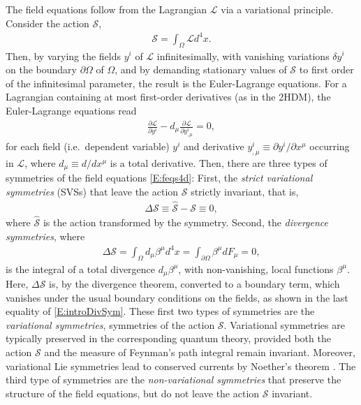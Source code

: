 \documentclass[a4paper,hidelinks, 12pt]{article}
\numberwithin{equation}{section}
\theoremstyle{plain}
\newcommand{\mc}{\mathcal}
\begin{document}
The field equations follow from the Lagrangian $\mc{L}$ via a variational principle. Consider the action $\mc{S}$, 
\begin{align}
	\mc{S}=\int_\Omega \mc{L} d^4 x.
\end{align}  
Then, by varying the fields $y^i$ of $\mc{L}$ infinitesimally, with vanishing 
variations $\delta y^i$ on the boundary $\partial \Omega$ of $\Omega$, and by demanding stationary values of $\mc{S}$ to first order of the infinitesimal parameter, the result is the %
Euler-Lagrange equations. For a Lagrangian containing at most first-order derivatives (as in the 2HDM), the Euler-Lagrange equations read
\begin{align}\label{E:feqs4d}
	\frac{\partial \mc{L}}{\partial y^i}-d_\mu \frac{\partial \mc{L}}{\partial y^i_{,\mu}}=0,
\end{align}
   for each field (i.e.~dependent variable) $y^i$ and derivative $y^i_{,\mu}\equiv \partial y^i/\partial x^\mu$ occurring in $\mc{L}$, where $d_\mu\equiv d/dx^\mu$ is a total derivative. Then, there are three types of symmetries
		of the field equations \eqref{E:feqs4d}: First, the \textit{strict variational symmetries} (SVSs) that leave the action $\mc{S}$ strictly invariant, that is,
 \begin{align}
	\Delta \mc{S} \equiv \hat{\mc{S}}-\mc{S}\equiv 0, 	
\end{align}
	where $\hat{\mc{S}}$ is the action transformed by the symmetry.
		Second, the \textit{divergence symmetries}, where 
		\begin{align}\label{E:introDivSym}
		\Delta \mc{S}= \int_\Omega d_\mu \beta^\mu d^4x=\int_{\partial \Omega}\beta^\mu dF_\mu=0,  	
		\end{align}
		is the integral of a total divergence $d_\mu \beta^\mu$, with 
		non-vanishing, local functions $\beta^\mu$. %
	Here, $\Delta \mc{S}$ is, by the divergence theorem, converted to a boundary term, which vanishes under the usual boundary conditions on the fields, as shown in the last equality of \eqref{E:introDivSym}. These first two types of symmetries are the \textit{variational symmetries}, symmetries
		of the action $\mc{S}$. Variational symmetries are typically preserved in the corresponding quantum theory, provided both the action $\mc{S}$
 and the measure of Feynman’s path integral remain invariant. Moreover, variational Lie symmetries lead to conserved currents by Noether's theorem \cite{Noether1918}.  
		The third type of symmetries are the \textit{non-variational symmetries} that preserve the structure of the field equations, but do not leave the action $\mc{S}$ invariant. 
		
\end{document}
